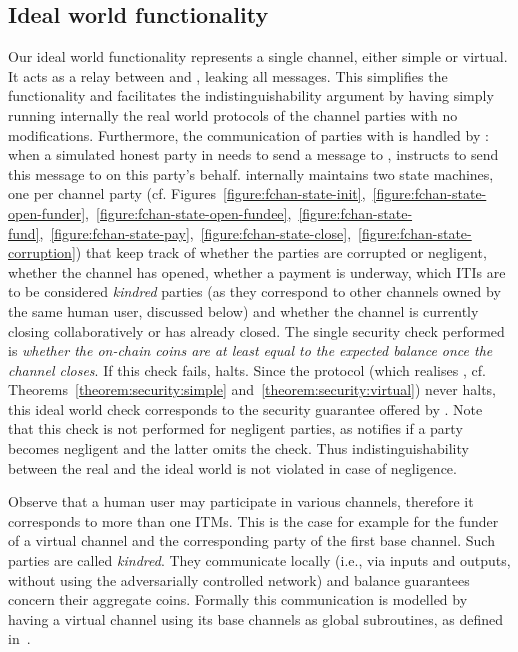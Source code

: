   \subsection{Ideal world functionality \fchan}
  \label{subsec:func-desc}
  Our ideal world functionality \fchan represents a single channel, either
  simple or virtual.
  It acts as a relay between \adversary and \environment, leaking all
  messages. This simplifies the functionality and facilitates the
  indistinguishability argument by having \simulator simply running internally
  the real world protocols of the channel parties \pchan with no modifications.
  Furthermore, the communication of parties with \ledger is handled by \fchan:
  when a simulated honest party in \simulator needs to send a message to
  \ledger, \simulator instructs \fchan to send this message to \ledger on this
  party's behalf.
  \fchan internally maintains two state machines, one per channel party (cf.
  Figures~\ref{figure:fchan-state-init},~\ref{figure:fchan-state-open-funder},~\ref{figure:fchan-state-open-fundee},~\ref{figure:fchan-state-fund},~\ref{figure:fchan-state-pay},~\ref{figure:fchan-state-close},~\ref{figure:fchan-state-corruption})
  that keep track of whether the parties are corrupted or negligent, whether the
  channel has opened, whether a payment is underway, which ITIs are to be
  considered \emph{kindred} parties (as they correspond to other channels
  owned by the same human user, discussed below) and whether the channel is
  currently closing collaboratively or has already
  closed. The single security check performed is \emph{whether the on-chain
  coins are at least equal to the expected balance once the channel closes}. If
  this check fails, \fchan halts. Since the protocol \pchan (which realises
  \fchan, cf. Theorems~\ref{theorem:security:simple}
  and~\ref{theorem:security:virtual}) never halts, this ideal world check
  corresponds to the security guarantee offered by \pchan. Note that this check
  is not performed for negligent parties, as \simulator notifies \fchan if a
  party becomes negligent and the latter omits the check. Thus
  indistinguishability between the real and the ideal world is not violated in
  case of negligence.

  Observe that a human user may participate in various channels, therefore it
  corresponds to more than one ITMs. This is the case for example for the funder
  of a virtual channel and the corresponding party of the first base channel.
  Such parties are called \emph{kindred}. They communicate locally (i.e., via
  inputs and outputs, without using the adversarially controlled network) and
  balance guarantees concern their aggregate coins. Formally this communication
  is modelled by having a virtual channel using its base channels as global
  subroutines, as defined in~\cite{DBLP:conf/tcc/BadertscherCHTZ20}.

